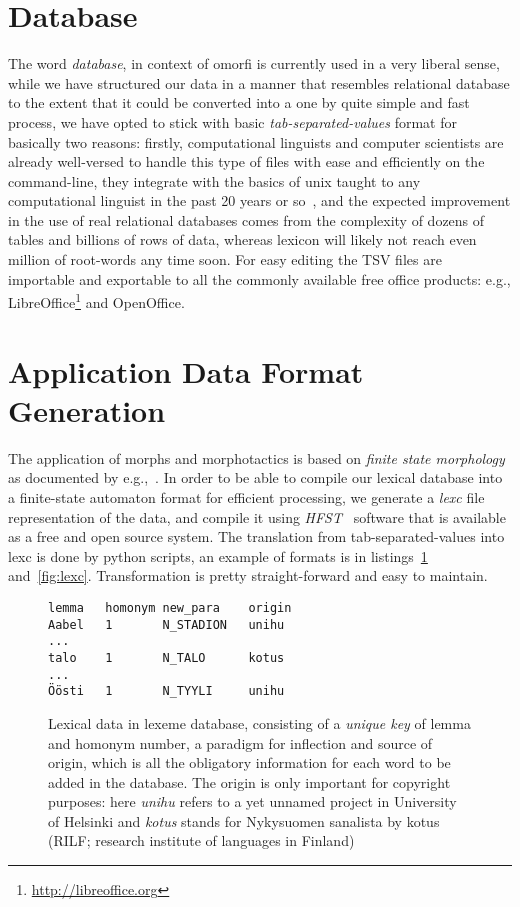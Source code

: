 \documentclass[11pt]{article}
\begin{document}
\section{Database}

The word \emph{database}, in context of omorfi is currently used in a very
liberal sense, while we have structured our data in a manner that resembles
relational database to the extent that it could be converted into a one by
quite simple and fast process, we have opted to stick with basic
\emph{tab-separated-values} format for basically two reasons: firstly,
computational linguists and computer scientists are already well-versed to
handle this type of files with ease and efficiently on the command-line, they
integrate with the basics of unix taught to any computational linguist in the
past 20 years or so~\cite{church1994unix}, and the expected improvement in the use of real
relational databases comes from the complexity of dozens of tables and billions
of rows of data, whereas lexicon will likely not reach even million of
root-words any time soon. For easy editing the TSV files are importable and
exportable to all the commonly available free office products: e.g.,
LibreOffice\footnote{\url{http://libreoffice.org}} and OpenOffice.

\section{Application Data Format Generation}

The application of morphs and morphotactics is based
on \emph{finite state morphology} as documented by
e.g.,~\cite{beesley2003finite}. In order to be able
to compile our lexical database into a finite-state
automaton format for efficient processing, we
generate a \emph{lexc} file representation of the
data, and compile it using \emph{HFST}~\cite{hfst}
software that is available as a free and open source
system. The translation from tab-separated-values
into lexc is done by python scripts, an example of
formats is in listings~\ref{fig:tsv}
and~\ref{fig:lexc}.  Transformation is pretty
straight-forward and easy to maintain.

\begin{figure}[ht]
    \centering
    \begin{verbatim}
lemma   homonym new_para    origin
Aabel   1       N_STADION   unihu
...
talo    1       N_TALO      kotus
...
Öösti   1       N_TYYLI     unihu
    \end{verbatim}
    \caption{Lexical data in lexeme database,
        consisting of a \emph{unique key} of lemma
        and homonym number, a paradigm for inflection
        and source of origin, which is all the
        obligatory information for each word to be
        added in the database. The origin is only
        important for copyright purposes: here
        \emph{unihu} refers to a yet unnamed project
        in University of Helsinki and \emph{kotus}
    stands for Nykysuomen sanalista by kotus (RILF;
research institute of languages in Finland)
\label{fig:tsv}}
\end{figure}
\end{document}
